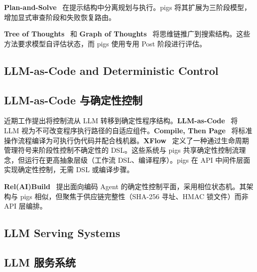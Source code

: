 \begin{chinese}
\textbf{Plan-and-Solve}~\citep{wang2023plan} 在提示结构中分离规划与执行。pigs 将其扩展为三阶段模型，增加显式审查阶段和失败恢复路由。
\end{chinese}

\begin{chinese}
\textbf{Tree of Thoughts}~\citep{yao2023tot} 和 \textbf{Graph of Thoughts}~\citep{besta2023got} 将思维链推广到搜索结构。这些方法要求模型自评估状态，而 pigs 使用专用 Post 阶段进行评估。
\end{chinese}

\subsection{LLM-as-Code and Deterministic Control}
\begin{chinese}
\subsection*{LLM-as-Code 与确定性控制}
\end{chinese}

\begin{chinese}
近期工作提出将控制流从 LLM 转移到确定性程序结构。\textbf{LLM-as-Code}~\citep{llmascode2026} 将 LLM 视为不可改变程序执行路径的自适应组件。\textbf{Compile, Then Page}~\citep{compilepage2026} 将标准操作流程编译为可执行伪代码并配合栈机器。\textbf{XFlow}~\citep{xflow2026} 定义了一种通过生命周期管理符号来阶段性控制不确定性的 DSL。这些系统与 pigs 共享确定性控制流理念，但运行在更高抽象层级（工作流 DSL、编译程序）。pigs 在 API 中间件层面实现确定性控制，无需 DSL 或编译步骤。
\end{chinese}

\begin{chinese}
\textbf{Rel(AI)Build}~\citep{relaibuild2026} 提出面向编码 Agent 的确定性控制平面，采用相位状态机。其架构与 pigs 相似，但聚焦于供应链完整性（SHA-256 寻址、HMAC 锁文件）而非 API 层编排。
\end{chinese}

\subsection{LLM Serving Systems}
\begin{chinese}
\subsection*{LLM 服务系统}
\end{chinese}


